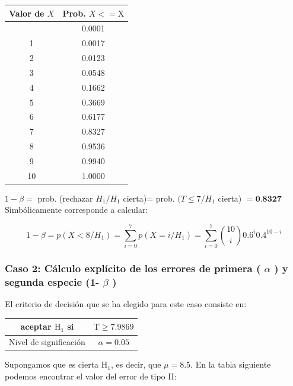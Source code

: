 \documentclass[
]{article}
\begin{document}
\begin{longtable}[]{@{}cc@{}}
\toprule\noalign{}
Valor de \(X\) & Prob. \(X<=\mathrm{X}\) \\
\midrule\noalign{}
\endhead
\bottomrule\noalign{}
\endlastfoot
0 & 0.0001 \\
1 & 0.0017 \\
2 & 0.0123 \\
3 & 0.0548 \\
4 & 0.1662 \\
5 & 0.3669 \\
6 & 0.6177 \\
7 & 0.8327 \\
8 & 0.9536 \\
9 & 0.9940 \\
10 & 1.0000 \\
\end{longtable}

\(1-\beta=\) prob. (rechazar \(H_{1}/H_{1}\) cierta)= prob. \((T \leq 7/H_{1}\) cierta) \(=\mathbf{0 . 8 3 2 7}\)\\
Simbólicamente corresponde a calcular:

\[
1-\beta=p\left(X<8 / H_{1}\right)=\sum_{i=0}^{7} p\left(X=i / H_{1}\right)=\sum_{i=0}^{7}\binom{10}{i} 0.6^{i} 0.4^{10-i}
\]

\subsubsection{\texorpdfstring{Caso 2: Cálculo explícito de los errores de primera ( \(\alpha\) ) y segunda especie (1- \(\beta\) )}{Caso 2: Cálculo explícito de los errores de primera ( \textbackslash alpha ) y segunda especie (1- \textbackslash beta )}}\label{caso-2-cuxe1lculo-expluxedcito-de-los-errores-de-primera-alpha-y-segunda-especie-1--beta}

El criterio de decisión que se ha elegido para este caso consiste en:

\begin{longtable}[]{@{}cc@{}}
\toprule\noalign{}
aceptar \(\mathrm{H}_{1}\) si & \(\mathrm{T} \geq 7.9869\) \\
\midrule\noalign{}
\endhead
\bottomrule\noalign{}
\endlastfoot
Nivel de significación & \(\alpha=0.05\) \\
\end{longtable}

Supongamos que es cierta \(\mathrm{H}_{1}\), es decir, que \(\mu=8.5\). En la tabla siguiente podemos encontrar el valor del error de tipo II:
\end{document}
